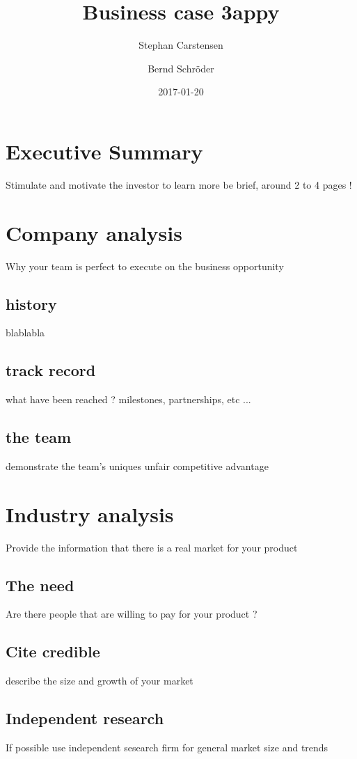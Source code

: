 \documentclass{article}
\title{Business case 3appy}
\date{2017-01-20}
\author{Stephan Carstensen}
\author{Bernd Schröder}
\begin{document}
\maketitle
\newpage

\section{Executive Summary}
Stimulate and motivate the investor to learn more
be brief, around 2 to 4 pages !

\newpage
{}

\section{Company analysis}
Why your team is perfect to execute on the business opportunity

\subsection{history}
blablabla

\subsection{track record}
what have been reached ? milestones, partnerships, etc ...

\subsection{the team}
demonstrate the team's uniques unfair competitive advantage

\section{Industry analysis}
Provide the information that there is a real market for your product

\subsection{The need}
Are there people that are willing to pay for your product ?

\subsection{Cite credible}
describe the size and growth of your market

\subsection{Independent research}
If possible use independent sesearch firm for general market size and trends
\end{document}
